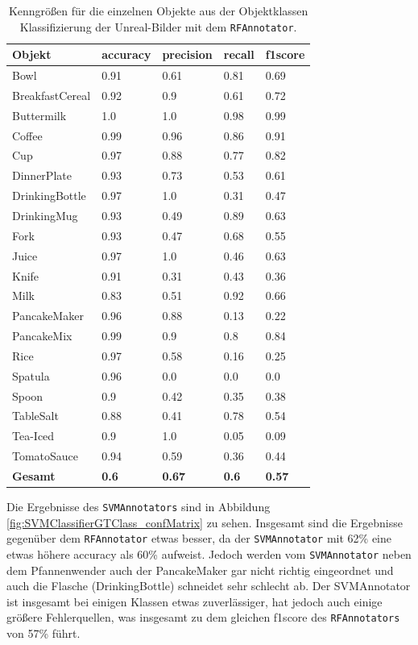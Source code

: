 \begin{table}
\begin{tabularx}{\textwidth}{Xllll}
\textbf{Objekt}	& \textbf{\gls{accuracy}} & \textbf{\gls{precision}}	& \textbf{\gls{recall}}	& \textbf{\gls{f1score}} \\ \hline
Bowl & 0.91 & 0.61 & 0.81 & 0.69 \\  
BreakfastCereal & 0.92 & 0.9 & 0.61 & 0.72 \\  
Buttermilk & 1.0 & 1.0 & 0.98 & 0.99 \\  
Coffee & 0.99 & 0.96 & 0.86 & 0.91 \\  
Cup & 0.97 & 0.88 & 0.77 & 0.82 \\  
DinnerPlate & 0.93 & 0.73 & 0.53 & 0.61 \\  
DrinkingBottle & 0.97 & 1.0 & 0.31 & 0.47 \\  
DrinkingMug & 0.93 & 0.49 & 0.89 & 0.63 \\  
Fork & 0.93 & 0.47 & 0.68 & 0.55 \\  
Juice & 0.97 & 1.0 & 0.46 & 0.63 \\  
Knife & 0.91 & 0.31 & 0.43 & 0.36 \\  
Milk & 0.83 & 0.51 & 0.92 & 0.66 \\  
PancakeMaker & 0.96 & 0.88 & 0.13 & 0.22 \\  
PancakeMix & 0.99 & 0.9 & 0.8 & 0.84 \\  
Rice & 0.97 & 0.58 & 0.16 & 0.25 \\  
Spatula & 0.96 & 0.0 & 0.0 & 0.0 \\  
Spoon & 0.9 & 0.42 & 0.35 & 0.38 \\  
TableSalt & 0.88 & 0.41 & 0.78 & 0.54 \\  
Tea-Iced & 0.9 & 1.0 & 0.05 & 0.09 \\  
TomatoSauce & 0.94 & 0.59 & 0.36 & 0.44 \\  \hline
\textbf{Gesamt}		&	\textbf{0.6}   &	\textbf{0.67}  & \textbf{0.6}     &  \textbf{0.57}     \\
\end{tabularx}
\caption[Objektklassen-spezifische Kenngrößen des RFAnnotators]{Kenngrößen für die einzelnen Objekte aus der Objektklassen Klassifizierung der Unreal-Bilder mit dem \texttt{RFAnnotator}.}
\label{tab:RFClassifierGTClass_metrics}
\end{table}

Die Ergebnisse des \texttt{SVMAnnotators} sind in Abbildung  \ref{fig:SVMClassifierGTClass_confMatrix} zu sehen. Insgesamt sind die Ergebnisse gegenüber dem \texttt{RFAnnotator} etwas besser, da der \texttt{SVMAnnotator} mit 62\% eine etwas höhere \gls{accuracy} als 60\% aufweist. Jedoch werden vom \texttt{SVMAnnotator} neben dem Pfannenwender auch der PancakeMaker gar nicht richtig eingeordnet und auch die Flasche (DrinkingBottle) schneidet sehr schlecht ab. Der SVMAnnotator ist insgesamt bei einigen Klassen etwas zuverlässiger, hat jedoch auch einige größere Fehlerquellen, was insgesamt zu dem gleichen \gls{f1score} des \texttt{RFAnnotators} von 57\% führt.  

